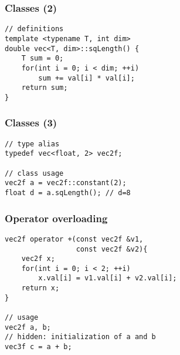 \begin{frame}[fragile]
\frametitle{Classes (2)}
\begin{lstlisting}
// definitions
template <typename T, int dim>
double vec<T, dim>::sqLength() {
    T sum = 0;
    for(int i = 0; i < dim; ++i)
        sum += val[i] * val[i];
    return sum;
}
\end{lstlisting}
\end{frame}

\begin{frame}[fragile]
\frametitle{Classes (3)}
\begin{lstlisting}
// type alias
typedef vec<float, 2> vec2f;

// class usage
vec2f a = vec2f::constant(2);
float d = a.sqLength(); // d=8
\end{lstlisting}
\end{frame}

\begin{frame}[fragile]
\frametitle{Operator overloading}
\begin{lstlisting}
vec2f operator +(const vec2f &v1,
                 const vec2f &v2){
    vec2f x;
    for(int i = 0; i < 2; ++i)
        x.val[i] = v1.val[i] + v2.val[i];
    return x;
}

// usage
vec2f a, b;
// hidden: initialization of a and b
vec3f c = a + b;
\end{lstlisting}
\end{frame}
